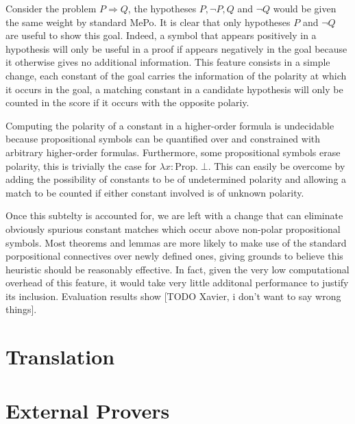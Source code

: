 \documentclass[runningheads]{llncs}
\begin{document}
Consider the problem \(P \Rightarrow Q \), the hypotheses \(P, \lnot P, Q\) and \(\lnot Q\) would be given the same weight by standard MePo. It is clear that only hypotheses \(P\) and \(\lnot Q\) are useful to show this goal. Indeed, a symbol that appears positively in a hypothesis will only be useful in a proof if appears negatively in the goal because it otherwise gives no additional information. This feature consists in a simple change, each constant of the goal carries the information of the polarity at which it occurs in the goal, a matching constant in a candidate hypothesis will only be counted in the score if it occurs with the opposite polariy.

Computing the polarity of a constant in a higher-order formula is undecidable because propositional symbols can be quantified over and constrained with arbitrary higher-order formulas. Furthermore, some propositional symbols erase polarity, this is trivially the case for \(\lambda x : \text{Prop}. \;\bot\). This can easily be overcome by adding the possibility of constants to be of undetermined polarity and allowing a match to be counted if either constant involved is of unknown polarity.

Once this subtelty is accounted for, we are left with a change that can eliminate obviously spurious constant matches which occur above non-polar propositional symbols. Most theorems and lemmas are more likely to make use of the standard porpositional connectives over newly defined ones, giving grounds to believe this heuristic should be reasonably effective. In fact, given the very low computational overhead of this feature, it would take very little additonal performance to justify its inclusion. Evaluation results show [TODO Xavier, i don't want to say wrong things].

\section{Translation}

\section{External Provers}
\end{document}
